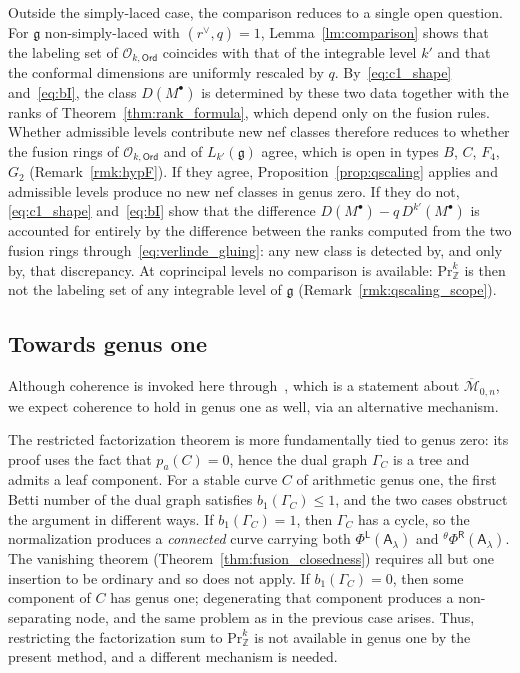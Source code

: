 \documentclass[12pt,a4paper,reqno]{amsart}
\numberwithin{equation}{section}
\theoremstyle{definition}
\newcommand{\g}{\mathfrak{g}}
\newcommand{\Z}{\mathbb{Z}}
\newcommand{\M}{\mathcal{M}}
\def\O{\mathcal{O}}
\def\Ord{\mathsf{Ord}}
\def\L{\mathsf{L}}
\def\R{\mathsf{R}}
\def\Pr{\mathrm{Pr}}
\def\la{\lambda}
\def\A{\mathsf{A}}
\begin{document}
Outside the simply-laced case, the comparison reduces to a single open question. For $\g$ non-simply-laced with $(r^\vee,q)=1$, Lemma~\ref{lm:comparison} shows that the labeling set of $\O_{k,\Ord}$ coincides with that of the integrable level $k'$ and that the conformal dimensions are uniformly rescaled by $q$. By~\eqref{eq:c1_shape} and~\eqref{eq:bI}, the class $D(M^\bullet)$ is determined by these two data together with the ranks of Theorem~\ref{thm:rank_formula}, which depend only on the fusion rules. Whether admissible levels contribute new nef classes therefore reduces to whether the fusion rings of $\O_{k,\Ord}$ and of $L_{k'}(\g)$ agree, which is open in types $B$, $C$, $F_4$, $G_2$ (Remark~\ref{rmk:hypF}). If they agree, Proposition~\ref{prop:qscaling} applies and admissible levels produce no new nef classes in genus zero. If they do not, \eqref{eq:c1_shape} and~\eqref{eq:bI} show that the difference $D(M^\bullet)-q\,D^{k'}(M^\bullet)$ is accounted for entirely by the difference between the ranks computed from the two fusion rings through~\eqref{eq:verlinde_gluing}: any new class is detected by, and only by, that discrepancy. At coprincipal levels no comparison is available: $\Pr^k_\Z$ is then not the labeling set of any integrable level of $\g$ (Remark~\ref{rmk:qscaling_scope}).

\subsection{Towards genus one}\label{subsec:genusone}
Although coherence is invoked here through~\cite{DG}, which is a statement about $\overline{\M}_{0,n}$, we expect coherence to hold in genus one as well, via an alternative mechanism.

The restricted factorization theorem is more fundamentally tied to genus zero: its proof uses the fact that $p_a(C)=0$, hence the dual graph $\Gamma_C$ is a tree and admits a leaf component. For a stable curve $C$ of arithmetic genus one, the first Betti number of the dual graph satisfies $b_1(\Gamma_C)\leq 1$, and the two cases obstruct the argument in different ways. If $b_1(\Gamma_C)=1$, then $\Gamma_C$ has a cycle, so the normalization produces a \emph{connected} curve carrying both $\Phi^\L(\A_\la)$ and ${}^\theta\Phi^\R(\A_\la)$. The vanishing theorem (Theorem~\ref{thm:fusion_closedness}) requires all but one insertion to be ordinary and so does not apply. If $b_1(\Gamma_C)=0$, then some component of $C$ has genus one; degenerating that component produces a non-separating node, and the same problem as in the previous case arises. Thus, restricting the factorization sum to $\Pr_\Z^k$ is not available in genus one by the present method, and a different mechanism is needed.
\end{document}
